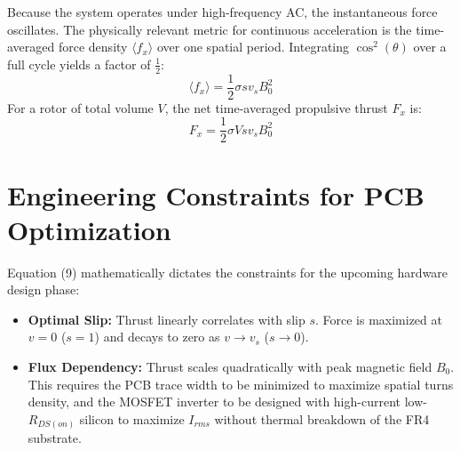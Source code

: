 \documentclass[12pt, a4paper]{article}
\begin{document}
Because the system operates under high-frequency AC, the instantaneous force oscillates. The physically relevant metric for continuous acceleration is the time-averaged force density $\langle f_x \rangle$ over one spatial period. Integrating $\cos^2(\theta)$ over a full cycle yields a factor of $\frac{1}{2}$:
\begin{equation}
    \langle f_x \rangle = \frac{1}{2} \sigma s v_s B_0^2
\end{equation}
For a rotor of total volume $V$, the net time-averaged propulsive thrust $F_x$ is:
\begin{equation}
    F_x = \frac{1}{2} \sigma V s v_s B_0^2
\end{equation}

\section{Engineering Constraints for PCB Optimization}
Equation (9) mathematically dictates the constraints for the upcoming hardware design phase:
\begin{itemize}
    \item \textbf{Optimal Slip:} Thrust linearly correlates with slip $s$. Force is maximized at $v=0$ ($s=1$) and decays to zero as $v \to v_s$ ($s \to 0$).
    \item \textbf{Flux Dependency:} Thrust scales quadratically with peak magnetic field $B_0$. This requires the PCB trace width to be minimized to maximize spatial turns density, and the MOSFET inverter to be designed with high-current low-$R_{DS(on)}$ silicon to maximize $I_{rms}$ without thermal breakdown of the FR4 substrate.
\end{itemize}
\end{document}
